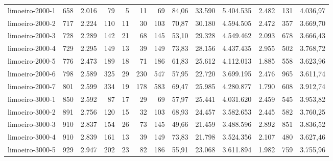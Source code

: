 \begin{table}[ht!]
{\begin{tabular}{lrrrrrrrrrrrr}
			\rowcolor{rowlight}limoeiro-2000-1                                                        & 658 & 2.016 & 79  & 5  & 11  & 69  & 84,06 & 33.590  & 5.404.535  & 2.482 & 131   & 4.036,97 \\
			\rowcolor{rowlight}limoeiro-2000-2                                                        & 717 & 2.224 & 110 & 11 & 30  & 103 & 70,87 & 30.180  & 4.594.505  & 2.472 & 357   & 3.669,70 \\
			\rowcolor{rowlight}limoeiro-2000-3                                                        & 728 & 2.289 & 142 & 21 & 68  & 145 & 53,10 & 29.328  & 4.549.462  & 2.093 & 678   & 3.666,43 \\
			\rowcolor{rowlight}limoeiro-2000-4                                                        & 729 & 2.295 & 149 & 13 & 39  & 149 & 73,83 & 28.156  & 4.437.435  & 2.955 & 502   & 3.768,72 \\
			\rowcolor{rowlight}limoeiro-2000-5                                                        & 776 & 2.473 & 189 & 18 & 71  & 186 & 61,83 & 25.612  & 4.112.013  & 1.885 & 558   & 3.623,96 \\
			\rowcolor{rowlight}limoeiro-2000-6                                                        & 798 & 2.589 & 325 & 29 & 230 & 547 & 57,95 & 22.720  & 3.699.195  & 2.476 & 965   & 3.611,74 \\
			\rowcolor{rowlight}limoeiro-2000-7                                                        & 801 & 2.599 & 334 & 19 & 178 & 583 & 69,47 & 25.985  & 4.280.877  & 1.790 & 608   & 3.912,74 \\
			\rowcolor{rowlight}limoeiro-3000-1                                                        & 850 & 2.592 & 87  & 17 & 29  & 69  & 57,97 & 25.441  & 4.031.620  & 2.459 & 545   & 3.953,82 \\
			\rowcolor{rowlight}limoeiro-3000-2                                                        & 891 & 2.756 & 120 & 15 & 32  & 103 & 68,93 & 24.457  & 3.582.653  & 2.445 & 582   & 3.760,25 \\
			\rowcolor{rowlight}limoeiro-3000-3                                                        & 910 & 2.837 & 154 & 26 & 73  & 145 & 49,66 & 21.459  & 3.488.596  & 2.892 & 851   & 3.836,52 \\
			\rowcolor{rowlight}limoeiro-3000-4                                                        & 910 & 2.839 & 161 & 13 & 39  & 149 & 73,83 & 21.798  & 3.524.356  & 2.107 & 480   & 3.627,46 \\
			\rowcolor{rowlight}limoeiro-3000-5                                                        & 929 & 2.947 & 202 & 23 & 82  & 186 & 55,91 & 23.068  & 3.611.894  & 1.982 & 759   & 3.755,96 \\

\end{tabular}}
\end{table}
